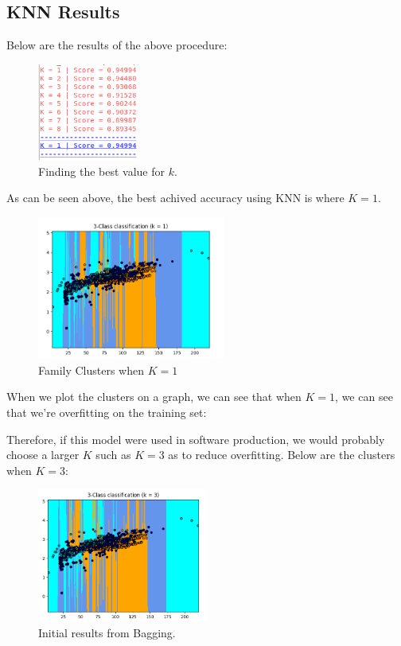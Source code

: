 \documentclass[12pt]{article}
\begin{document}
  \subsection{KNN Results}
  Below are the results of the above procedure:

          \begin{figure}[H]
          \centering
          \includegraphics[width=0.3\textwidth]{knn.png}
          \caption{Finding the best value for $k$.}
          \end{figure}
 
  As can be seen above, the best achived accuracy using KNN is where $K=1$.
  
          \begin{figure}[H]
          \centering
          \includegraphics[width=0.55\textwidth]{k1.png}
          \caption{Family Clusters when $K=1$}
          \end{figure}
 
  When we plot the clusters on a graph, we can see that when $K = 1$, we can see that we're overfitting on the training set:


  Therefore, if this model were used in software production, we would probably choose a larger $K$ such as $K=3$ as to reduce overfitting. Below are the clusters when $K=3$:

          \begin{figure}[H]
          \centering
          \includegraphics[width=0.5\textwidth]{k3.png}
          \caption{Initial results from Bagging.}
          \end{figure}
\end{document}
